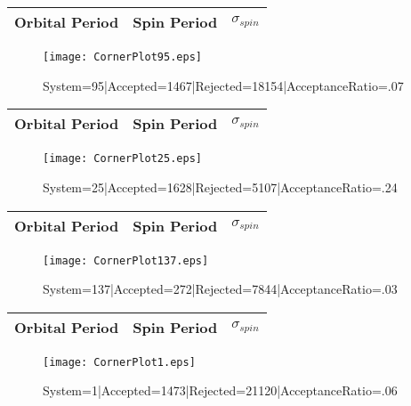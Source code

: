 \documentclass[10pt]{article}
\begin{document}
\begin{center}
        \begin{tabular}{|c|c|c|}
        \hline
Orbital Period & Spin Period & $\sigma_{spin}$ \\
 \hline
        \end{tabular}
        \end{center}
\begin{figure}[h] 
        \texttt{[image: CornerPlot95.eps]}
        \caption{System=95|Accepted=1467|Rejected=18154|AcceptanceRatio=.07}
        \label{S95}
        \centering
        \end{figure}
\begin{center}
        \begin{tabular}{|c|c|c|}
        \hline
Orbital Period & Spin Period & $\sigma_{spin}$ \\
 \hline
        \end{tabular}
        \end{center}
\begin{figure}[h] 
        \texttt{[image: CornerPlot25.eps]}
        \caption{System=25|Accepted=1628|Rejected=5107|AcceptanceRatio=.24}
        \label{S25}
        \centering
        \end{figure}
\begin{center}
        \begin{tabular}{|c|c|c|}
        \hline
Orbital Period & Spin Period & $\sigma_{spin}$ \\
 \hline
        \end{tabular}
        \end{center}
\begin{figure}[h] 
        \texttt{[image: CornerPlot137.eps]}
        \caption{System=137|Accepted=272|Rejected=7844|AcceptanceRatio=.03}
        \label{S137}
        \centering
        \end{figure}
\begin{center}
        \begin{tabular}{|c|c|c|}
        \hline
Orbital Period & Spin Period & $\sigma_{spin}$ \\
 \hline
        \end{tabular}
        \end{center}
\begin{figure}[h] 
        \texttt{[image: CornerPlot1.eps]}
        \caption{System=1|Accepted=1473|Rejected=21120|AcceptanceRatio=.06}
        \label{S1}
        \centering
        \end{figure}
\end{document}
